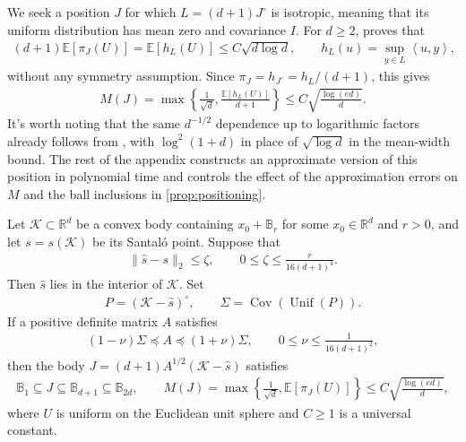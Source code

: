 \documentclass[12pt,cleveref]{jmlr}
\newcommand{\R}{\mathbb R}
\newcommand{\E}{\mathbb E}
\newcommand{\K}{\mathcal K}
\newcommand{\1}{\mathbf 1}
\newcommand{\ip}[2]{\left\langle #1,#2\right\rangle}
\begin{document}
We seek a position $J$ for which $L=(d+1)J^\circ$ is isotropic, meaning
that its uniform distribution has mean zero and covariance $I$.
For $d\geq2$, \citet[Theorem~1.1]{bizeul2026optimal} proves that
\begin{align}
    (d+1)\E[\pi_J(U)]=\E[h_L(U)]\leq C\sqrt{d\log d},
    \qquad h_L(u)=\sup_{y\in L}\ip{u}{y},
\end{align}
without any symmetry assumption. Since
$\pi_J=h_{J^\circ}=h_L/(d+1)$, this gives
\begin{align}
    M(J)
    =\max\left\{\frac1{\sqrt d},\frac{\E[h_L(U)]}{d+1}\right\}
    \leq C\sqrt{\frac{\log(ed)}d}.
\end{align}
It's worth noting that the same $d^{-1/2}$ dependence up to logarithmic factors already follows
from \citet[Theorem~1.2]{milman2015mean}, with $\log^2(1+d)$ in place
of $\sqrt{\log d}$ in the mean-width bound. The rest of the appendix
constructs an approximate version of this position in polynomial time
and controls the effect of the approximation errors on $M$ and the ball
inclusions in \cref{prop:positioning}.

\begin{theorem}
    \label{thm:approximate-positioning}
    Let $\K\subset\R^d$ be a convex body containing
    $x_0+\mathbb B_r$ for some $x_0\in\R^d$ and $r>0$, and let
    $s=s(\K)$ be its Santal\'o point. Suppose that
    \begin{align}
        \|\hat s-s\|_2\leq\zeta,
        \qquad 0\leq\zeta\leq\frac{r}{16(d+1)^4}.
    \end{align}
    Then $\hat s$ lies in the interior of $\K$.
    Set
    \begin{align}
        P=(\K-\hat s)^\circ,
        \qquad \Sigma=\operatorname{Cov}(\operatorname{Unif}(P)).
    \end{align}
    If a positive definite matrix $A$ satisfies
    \begin{align}
        (1-\nu)\Sigma\preceq A\preceq(1+\nu)\Sigma,
        \qquad 0\leq\nu\leq\frac1{16(d+1)^2},
    \end{align}
    then the body $J=(d+1)A^{1/2}(\K-\hat s)$ satisfies
    \begin{align}
        \mathbb B_1\subseteq J\subseteq\mathbb B_{d+1}
        \subseteq\mathbb B_{2d},
        \qquad
        M(J)=\max\left\{\frac1{\sqrt d},\E[\pi_J(U)]\right\}
        \leq C\sqrt{\frac{\log(ed)}d},
    \end{align}
    where $U$ is uniform on the Euclidean unit sphere and $C\geq1$
    is a universal constant.
\end{theorem}
\end{document}
